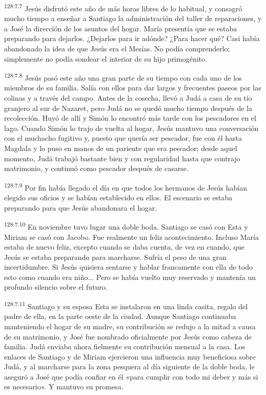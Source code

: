 \par 
\textsuperscript{128:7.7} Jesús disfrutó este año de más horas libres de lo habitual, y consagró mucho tiempo a enseñar a Santiago la administración del taller de reparaciones, y a José la dirección de los asuntos del hogar. María presentía que se estaba preparando para dejarlos. ¿Dejarlos para ir adónde? ¿Para hacer qué? Casi había abandonado la idea de que Jesús era el Mesías. No podía comprenderlo; simplemente no podía sondear el interior de su hijo primogénito.

\par 
\textsuperscript{128:7.8} Jesús pasó este año una gran parte de su tiempo con cada uno de los miembros de su familia. Salía con ellos para dar largos y frecuentes paseos por las colinas y a través del campo. Antes de la cosecha, llevó a Judá a casa de su tío granjero al sur de Nazaret, pero Judá no se quedó mucho tiempo después de la recolección. Huyó de allí y Simón lo encontró más tarde con los pescadores en el lago. Cuando Simón lo trajo de vuelta al hogar, Jesús mantuvo una conversación con el muchacho fugitivo y, puesto que quería ser pescador, fue con él hasta Magdala y lo puso en manos de un pariente que era pescador; desde aquel momento, Judá trabajó bastante bien y con regularidad hasta que contrajo matrimonio, y continuó como pescador después de casarse.

\par 
\textsuperscript{128:7.9} Por fin había llegado el día en que todos los hermanos de Jesús habían elegido sus oficios y se habían establecido en ellos. El escenario se estaba preparando para que Jesús abandonara el hogar.

\par 
\textsuperscript{128:7.10} En noviembre tuvo lugar una doble boda. Santiago se casó con Esta y Miriam se casó con Jacobo. Fue realmente un feliz acontecimiento. Incluso María estaba de nuevo feliz, excepto cuando se daba cuenta, de vez en cuando, que Jesús se estaba preparando para marcharse. Sufría el peso de una gran incertidumbre. Si Jesús quisiera sentarse y hablar francamente con ella de todo esto como cuando era niño... Pero se había vuelto muy reservado y mantenía un profundo silencio sobre el futuro.

\par 
\textsuperscript{128:7.11} Santiago y su esposa Esta se instalaron en una linda casita, regalo del padre de ella, en la parte oeste de la ciudad. Aunque Santiago continuaba manteniendo el hogar de su madre, su contribución se redujo a la mitad a causa de su matrimonio, y José fue nombrado oficialmente por Jesús como cabeza de familia. Judá enviaba ahora fielmente su contribución mensual a la casa. Los enlaces de Santiago y de Miriam ejercieron una influencia muy beneficiosa sobre Judá, y al marcharse para la zona pesquera al día siguiente de la doble boda, le aseguró a José que podía confiar en él «para cumplir con todo mi deber y más si es necesario». Y mantuvo su promesa.

